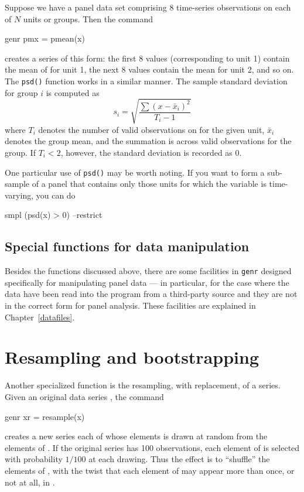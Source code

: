 Suppose we have a panel data set comprising 8 time-series observations
on each of $N$ units or groups.  Then the command
%
\begin{code}
genr pmx = pmean(x)
\end{code}
%
creates a series of this form: the first 8 values (corresponding to
unit 1) contain the mean of  for unit 1, the next 8 values
contain the mean for unit 2, and so on.  The \texttt{psd()} function
works in a similar manner.  The sample standard deviation for group
$i$ is computed as
\[
s_i = \sqrt{\frac{\sum(x-\bar{x}_i)^2}{T_i-1}}
\]
where $T_i$ denotes the number of valid observations on 
for the given unit, $\bar{x}_i$ denotes the group mean, and the
summation is across valid observations for the group.  If $T_i < 2$,
however, the standard deviation is recorded as 0.

One particular use of \texttt{psd()} may be worth noting.  If you want
to form a sub-sample of a panel that contains only those units for
which the variable  is time-varying, you can do
%
\begin{code}
smpl (psd(x) > 0) --restrict
\end{code}

\subsection{Special functions for data manipulation}
\label{panel-manip}

Besides the functions discussed above, there are some facilities in
\texttt{genr} designed specifically for manipulating panel data --- in
particular, for the case where the data have been read into the
program from a third-party source and they are not in the correct
form for panel analysis.  These facilities are explained in
Chapter~\ref{datafiles}.


\section{Resampling and bootstrapping}
\label{genr-resample}

Another specialized function is the resampling, with replacement, of a
series.  Given an original data series , the command
%
\begin{code}
genr xr = resample(x)
\end{code}
%
creates a new series each of whose elements is drawn at random from
the elements of .  If the original series has 100
observations, each element of  is selected with probability
$1/100$ at each drawing.  Thus the effect is to ``shuffle'' the
elements of , with the twist that each element of
 may appear more than once, or not at all, in .

